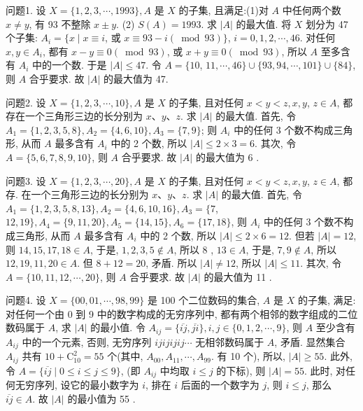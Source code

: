 
问题1. 设 $X=\{1,2,3, \cdots, 1993\}, A$ 是 $X$ 的子集, 且满足:(1)对 $A$ 中任何两个数 $x \neq y$, 有 93 不整除 $x \pm y$. (2) $S(A)=1993$. 求 $|A|$ 的最大值.
将 $X$ 划分为 47 个子集: $A_i=\{x \mid x \equiv i$, 或 $x \equiv 93-i(\bmod 93)\}$, $i=0,1,2, \cdots, 46$. 对任何 $x, y \in A_i$, 都有 $x-y \equiv 0(\bmod 93)$, 或 $x+y \equiv 0(\bmod 93)$, 所以 $A$ 至多含有 $A_i$ 中的一个数.
于是 $|A| \leqslant 47$. 令 $A=\{10$, $11, \cdots, 46\} \cup\{93,94, \cdots, 101\} \cup\{84\}$, 则 $A$ 合乎要求.
故 $|A|$ 的最大值为 47.



问题2. 设 $X=\{1,2,3, \cdots, 10\}, A$ 是 $X$ 的子集, 且对任何 $x<y<z, x, y$, $z \in A$, 都存在一个三角形三边的长分别为 $x 、 y 、 z$. 求 $|A|$ 的最大值.
首先, 令 $A_1=\{1,2,3,5,8\}, A_2=\{4,6,10\}, A_3=\{7,9\}$; 则 $A_i$ 中的任何 3 个数不构成三角形, 从而 $A$ 最多含有 $A_i$ 中的 2 个数, 所以 $|A| \leqslant 2 \times 3=6$. 其次, 令 $A=\{5,6,7,8,9,10\}$, 则 $A$ 合乎要求.
故 $|A|$ 的最大值为 6 .



问题3. 设 $X=\{1,2,3, \cdots, 20\}, A$ 是 $X$ 的子集, 且对任何 $x<y<z, x, y$, $z \in A$, 都存.
在一个三角形三边的长分别为 $x 、 y 、 z$. 求 $|A|$ 的最大值.
首先, 令 $A_1=\{1,2,3,5,8,13\}, A_2=\{4,6,10,16\}, A_3=\{7$, $12,19\}, A_4=\{9,11,20\}, A_5=\{14,15\}, A_6=\{17,18\}$, 则 $A_i$ 中的任何 3 个数不构成三角形, 从而 $A$ 最多含有 $A_i$ 中的 2 个数, 所以 $|A| \leqslant 2 \times 6=12$. 但若 $|A|=12$, 则 $14,15,17,18 \in A$, 于是, $1,2,3,5 \notin A$, 所以 8 , $13 \in A$, 于是, $7,9 \notin A$, 所以 $12,19,11,20 \in A$. 但 $8+12=20$, 矛盾.
所以 $|A| \neq 12$, 所以 $|A| \leqslant 11$. 其次, 令 $A=\{10,11,12, \cdots, 20\}$, 则 $A$ 合乎要求.
故 $|A|$ 的最大值为 11 .



问题4. 设 $X=\{00,01, \cdots, 98,99\}$ 是 100 个二位数码的集合, $A$ 是 $X$ 的子集, 满足: 对任何一个由 0 到 9 中的数字构成的无穷序列中, 都有两个相邻的数字组成的二位数码属于 $A$, 求 $|A|$ 的最小值.
令 $A_{i j}=\{\overline{i j}, \overline{j i}\}, i, j \in\{0,1,2, \cdots, 9\}$, 则 $A$ 至少含有 $A_{i j}$ 中的一个元素, 否则, 无穷序列 $i j i j i j i j \cdots$ 无相邻数码属于 $A$, 矛盾.
显然集合 $A_{i j}$ 共有 $10+\mathrm{C}_{10}^2=55$ 个(其中, $A_{00}, A_{11}, \cdots, A_{99}$. 有 10 个), 所以, $|A| \geqslant 55$. 此外, 令 $A=\{\overline{i j} \mid 0 \leqslant i \leqslant j \leqslant 9\}$, (即 $A_{i j}$ 中均取 $i \leqslant j$ 的下标), 则 $|A|=55$. 此时, 对任何无穷序列, 设它的最小数字为 $i$, 排在 $i$ 后面的一个数字为 $j$, 则 $i \leqslant j$, 那么 $\overline{i j} \in A$. 故 $|A|$ 的最小值为 55 .



